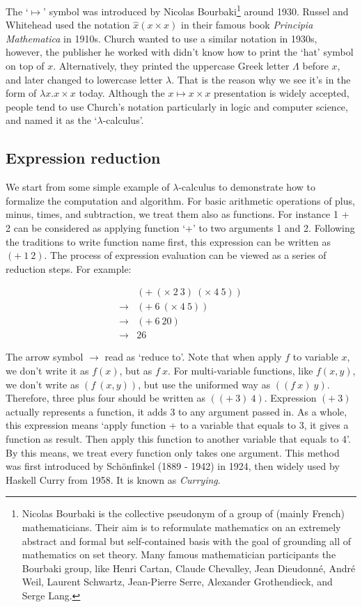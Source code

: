 \documentclass[b5paper]{article}
\begin{document}
The `$\mapsto$' symbol was introduced by Nicolas Bourbaki\footnote{Nicolas Bourbaki is the collective pseudonym of a group of (mainly French) mathematicians. Their aim is to reformulate mathematics on an extremely abstract and formal but self-contained basis with the goal of grounding all of mathematics on set theory. Many famous mathematician participants the Bourbaki group, like Henri Cartan, Claude Chevalley, Jean Dieudonné, André Weil, Laurent Schwartz, Jean-Pierre Serre, Alexander Grothendieck, and Serge Lang.} around 1930. Russel and Whitehead used the notation $\hat{x}(x \times x)$ in their famous book {\em Principia Mathematica} in 1910s. Church wanted to use a similar notation in 1930s, however, the publisher he worked with didn't know how to print the `hat' symbol on top of $x$. Alternatively, they printed the uppercase Greek letter $\Lambda$ before $x$, and later changed to lowercase letter $\lambda$. That is the reason why we see it's in the form of $\lambda x . x \times x$ today\cite{Dowek2011}. Although the $x \mapsto x \times x$ presentation is widely accepted, people tend to use Church's notation particularly in logic and computer science, and named it as the `$\lambda$-calculus'.

\subsection{Expression reduction}

We start from some simple example of $\lambda$-calculus to demonstrate how to formalize the computation and algorithm. For basic arithmetic operations of plus, minus, times, and subtraction, we treat them also as functions. For instance 1 + 2 can be considered as applying function `+' to two arguments 1 and 2. Following the traditions to write function name first, this expression can be written as $(+\ 1\ 2)$. The process of expression evaluation can be viewed as a series of reduction steps. For example:

\[
\begin{array}{ll}
    & (+\ (\times\ 2\ 3)\ (\times\ 4\ 5)) \\
\to & (+\ 6\ (\times\ 4\ 5)) \\
\to & (+\ 6\ 20) \\
\to & 26
\end{array}
\]

The arrow symbol $\to$ read as `reduce to'. Note that when apply $f$ to variable $x$, we don't write it as $f(x)$, but as $f\ x$. For multi-variable functions, like $f(x, y)$, we don't write as $(f\ (x, y))$, but use the uniformed way as $((f\ x)\ y)$. Therefore, three plus four should be written as $((+\ 3)\ 4)$. Expression $(+\ 3)$ actually represents a function, it adds 3 to any argument passed in. As a whole, this expression means `apply function + to a variable that equals to 3, it gives a function as result. Then apply this function to another variable that equals to 4'. By this means, we treat every function only takes one argument. This method was first introduced by Schönfinkel (1889 - 1942) in 1924, then widely used by Haskell Curry from 1958. It is known as {\em Currying}\cite{SPJ1987}.
\end{document}

